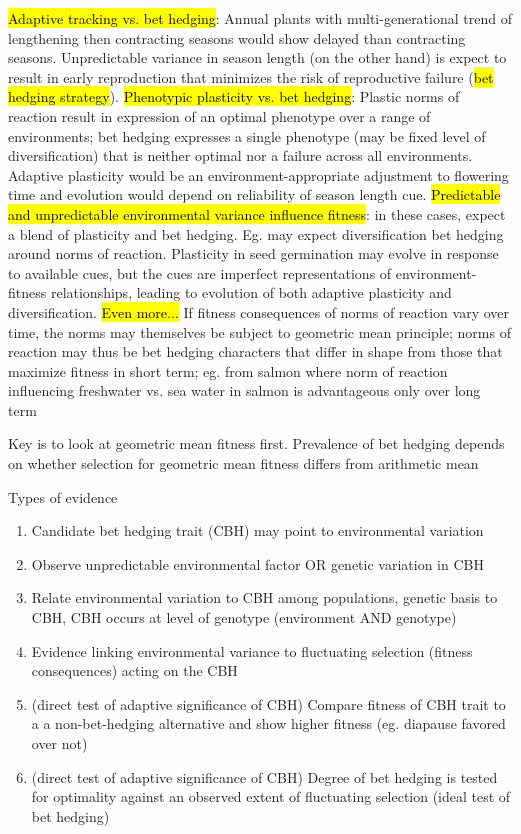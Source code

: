 \documentclass[12pt, oneside, titlepage]{article}   	%
\begin{document}
{\hl{Adaptive tracking vs. bet hedging}: Annual plants with multi-generational trend of lengthening then contracting seasons would show delayed than contracting seasons. Unpredictable variance in season length (on the other hand) is expect to result in early reproduction that minimizes the risk of reproductive failure (\hl{bet hedging strategy}).
\hl{Phenotypic plasticity vs. bet hedging}: Plastic norms of reaction result in expression of an optimal phenotype over a range of environments; bet hedging expresses a single phenotype (may be fixed level of diversification) that is neither optimal nor a failure across all environments. Adaptive plasticity would be an environment-appropriate adjustment to flowering time and evolution would depend on reliability of season length cue.
\hl{Predictable and unpredictable environmental variance influence fitness}: in these cases, expect a blend of plasticity and bet hedging. Eg. may expect diversification bet hedging around norms of reaction. Plasticity in seed germination may evolve in response to available cues, but the cues are imperfect representations of environment-fitness relationships, leading to evolution of both adaptive plasticity and diversification.
\hl{Even more...} If fitness consequences of norms of reaction vary over time, the norms may themselves be subject to geometric mean principle; norms of reaction may thus be bet hedging characters that differ in shape from those that maximize fitness in short term; eg. from salmon where norm of reaction influencing freshwater vs. sea water in salmon is advantageous only over long term

Key is to look at geometric mean fitness first. Prevalence of bet hedging depends on whether selection for geometric mean fitness differs from arithmetic mean

Types of evidence
\begin{enumerate}
\item Candidate bet hedging trait (CBH) may point to environmental variation
\item Observe unpredictable environmental factor OR genetic variation in CBH
\item Relate environmental variation to CBH among populations, genetic basis to CBH, CBH occurs at level of genotype (environment AND genotype)
\item Evidence linking environmental variance to fluctuating selection (fitness consequences) acting on the CBH 
\item (direct test of adaptive significance of CBH) Compare fitness of CBH trait to a a non-bet-hedging alternative and show higher fitness (eg. diapause favored over not)
\item (direct test of adaptive significance of CBH) Degree of bet hedging is tested for optimality against an observed extent of fluctuating selection (ideal test of bet hedging)
\end{enumerate}

}
\end{document}
